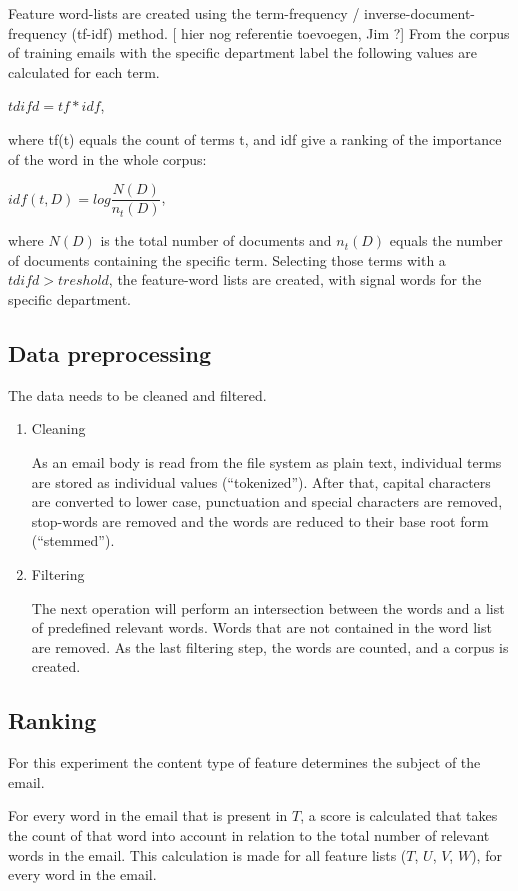 \documentclass[journal]{IEEEtran}
\begin{document}
Feature word-lists are created using the term-frequency / inverse-document-frequency (tf-idf) method. [ hier nog referentie toevoegen, Jim ?] From the corpus of training emails with the specific department label the following values are calculated for each term. 
\begin{center}
    $tdifd = tf * idf$,
\end{center}
where tf(t) equals the count of terms t, and idf give a ranking of the importance of the word in the whole corpus: 
\begin{center}
    $idf(t, D) = log\dfrac{N(D)}{n_t(D)}$, 
\end{center}
where $N(D)$ is the total number of documents and $n_t(D)$ equals the number of documents containing the specific term. 
Selecting those terms with a $tdifd > treshold$, the feature-word lists are created, with signal words for the specific department.

\subsection{Data preprocessing}
The data needs to be cleaned and filtered.

\begin{enumerate}
    \item Cleaning

    As an email body is read from the file system as plain text, individual terms are stored as individual values (``tokenized''). After that, capital characters are converted to lower case, punctuation and special characters are removed, stop-words are removed and the words are reduced to their base root form (``stemmed'').

    \item Filtering

    The next operation will perform an intersection between the words and a list of predefined relevant words. Words that are not contained in the word list are removed. As the last filtering step, the words are counted, and a corpus is created.

\end{enumerate}

\subsection{Ranking}

For this experiment the content type of feature determines the subject of the email.

For every word in the email that is present in $T$, a score is calculated that takes the count of that word into account in relation to the total number of relevant words in the email. This calculation is made for all feature lists ($T$, $U$, $V$, $W$), for every word in the email. 
\end{document}
